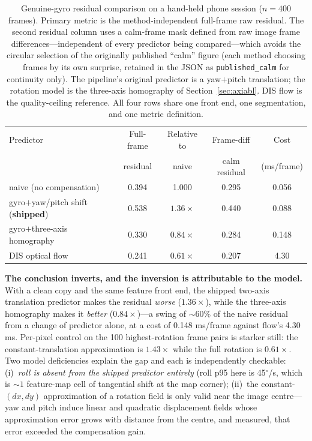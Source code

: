 \documentclass[12pt,a4paper]{article}
\begin{document}
\begin{table}[htbp]
  \centering
  \small
  \caption{Genuine-gyro residual comparison on a hand-held phone session ($n{=}400$ frames). Primary metric is the method-independent full-frame raw residual. The second residual column uses a calm-frame mask defined from raw image frame differences---independent of every predictor being compared---which avoids the circular selection of the originally published ``calm'' figure (each method choosing frames by its own surprise, retained in the JSON as \texttt{published\_calm} for continuity only). The pipeline's original predictor is a yaw$+$pitch translation; the rotation model is the three-axis homography of Section~\ref{sec:axiabl}. DIS flow is the quality-ceiling reference. All four rows share one front end, one segmentation, and one metric definition.}
  \label{tab:realimu}
  \begin{tabular}{lcccc}
    \toprule
    Predictor & Full-frame & Relative to & Frame-diff & Cost \\
     & residual & naive & calm residual & (ms/frame) \\
    \midrule
    naive (no compensation) & 0.394 & 1.000 & 0.295 & 0.056 \\
    gyro$+$yaw/pitch shift (\textbf{shipped}) & 0.538 & $\mathbf{1.36\times}$ & 0.440 & 0.088 \\
    gyro$+$three-axis homography & $\mathbf{0.330}$ & $\mathbf{0.84\times}$ & 0.284 & 0.148 \\
    DIS optical flow & 0.241 & $0.61\times$ & 0.207 & 4.30 \\
    \bottomrule
  \end{tabular}
\end{table}

\textbf{The conclusion inverts, and the inversion is attributable to the model.} With a clean copy and the same feature front end, the shipped two-axis translation predictor makes the residual \emph{worse} ($1.36\times$), while the three-axis homography makes it \emph{better} ($0.84\times$)---a swing of ${\sim}60$\% of the naive residual from a change of predictor alone, at a cost of 0.148 ms/frame against flow's 4.30 ms. Per-pixel control on the 100 highest-rotation frame pairs is starker still: the constant-translation approximation is $1.43\times$ while the full rotation is $0.61\times$. Two model deficiencies explain the gap and each is independently checkable: (i)~\emph{roll is absent from the shipped predictor entirely} (roll p95 here is 45$^\circ$/s, which is ${\sim}1$ feature-map cell of tangential shift at the map corner); (ii)~the constant-$(dx,dy)$ approximation of a rotation field is only valid near the image centre---yaw and pitch induce linear and quadratic displacement fields whose approximation error grows with distance from the centre, and measured, that error exceeded the compensation gain.
\end{document}
